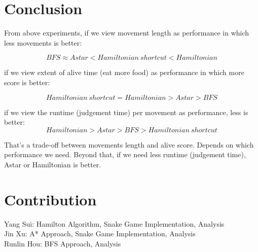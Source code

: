 \documentclass[12pt]{article}
\begin{document}
\section{Conclusion}

From above experiments, if we view movement length as performance in which less movements is better:

      $$BFS \approx A star < Hamiltonian\ shortcut < Hamiltonian$$
     
if we view extent of alive time (eat more food) as performance in which more score is better:
       
       $$Hamiltonian\ shortcut = Hamiltonian > Astar > BFS$$
       
if we view the runtime (judgement time) per movement as performance, less is better:
      $$Hamiltonian > A star > BFS > Hamiltonian\ shortcut$$
      
That's a trade-off between movements length and alive score. Depends on which performance we need. Beyond that, if we need less runtime (judgement time), Astar or Hamiltonian is better.

\section{Contribution}

Yang Sui: Hamilton Algorithm, Snake Game Implementation, Analysis\\
Jin Xu: A* Approach, Snake Game Implementation, Analysis\\
Runlin Hou: BFS Approach, Analysis
\end{document}
